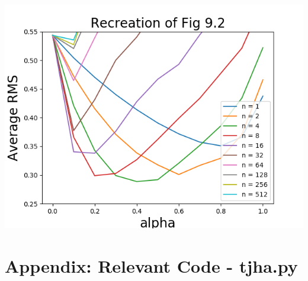 \documentclass[11pt]{article}
\begin{document}
\includegraphics[scale=1.0]{FigureExample.png}

\section*{Appendix: Relevant Code - tjha.py}
   
\end{document}
